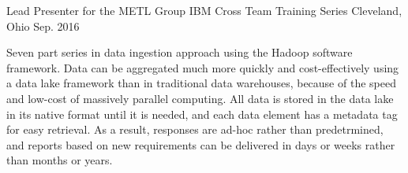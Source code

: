 \begin{cventries}
  \cventry
    {Lead Presenter for the METL Group} %
    {IBM Cross Team Training Series} %
    {Cleveland, Ohio} %
    {Sep. 2016} %
    {
      \begin{cvitems} %
        \item {Seven part series in data ingestion approach using the Hadoop software framework.  Data can be aggregated much more quickly and cost-effectively using a data lake framework than in traditional data warehouses, because of the speed and low-cost of massively parallel computing.  All data is stored in the data lake in its native format until it is needed, and each data element has a metadata tag for easy retrieval.  As a result, responses are ad-hoc rather than predetrmined, and reports based on new requirements can be delivered in days or weeks rather than months or years.}
      \end{cvitems}
    }

\end{cventries}
